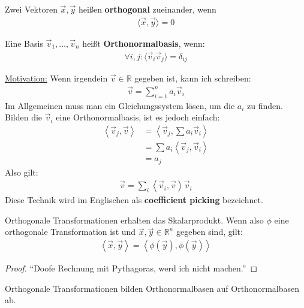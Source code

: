 \documentclass{report}
\newcommand*{\newpar}{\par\vspace{\baselineskip}\noindent}
\newcommand{\tbf}[1]{\textbf{#1}}
\newcommand{\ul}[1]{\underline{#1}}
\newcommand{\bR}{\mathbb{R}}
\newcommand{\vv}{\vec{v}}
\newcommand{\vx}{\vec{x}}
\newcommand{\vy}{\vec{y}}
\newcommand{\scalar}[2]{\left\langle #1, #2 \right\rangle}
\begin{document}
\begin{definition}
 Zwei Vektoren $\vx, \vy$ heißen \tbf{orthogonal} zueinander, wenn 
 \begin{align*}
  \langle \vx, \vy \rangle = 0
 \end{align*}
\end{definition}
\begin{definition}
 Eine Basis $\vv_1, \hdots, \vv_n$ heißt \tbf{Orthonormalbasis}, wenn:
 \begin{align*}
   \forall i,j : \langle \vv_i \vv_j \rangle = \delta_{ij}
 \end{align*}
\end{definition}
\newpar
\ul{Motivation:}
Wenn irgendein $\vv \in \bR$ gegeben ist, kann ich schreiben:
\begin{align*}
 \vv = \sum_{i = 1}^n a_i \vv_i
\end{align*}
Im Allgemeinen muss man ein Gleichungssystem lösen, um die $a_i$ zu finden. Bilden die $\vv_i$ eine Orthonormalbasis, ist es jedoch einfach:
\begin{align*}
  \scalar{\vv_j}{\vv} &= \scalar{\vv_j}{\sum a_i \vv_i}\\
                      &= \sum a_i \scalar{\vv_j}{\vv_i}\\
                      &= a_j
\end{align*}
Also gilt:
\begin{align*}
 \vv = \sum_i \scalar{\vv_i}{\vv} \vv_i
\end{align*}
Diese Technik wird im Englischen als \tbf{coefficient picking} bezeichnet.
\begin{theorem}
 Orthogonale Transformationen erhalten das Skalarprodukt. Wenn also $\phi$ eine orthogonale Transformation ist und $\vx, \vy \in \bR^n$ gegeben sind, gilt:
 \begin{align*}
  \scalar{\vx}{\vy} = \scalar{\phi(\vy)}{\phi(\vy)}
 \end{align*}
\end{theorem}
\begin{proof}
 ``Doofe Rechnung mit Pythagoras, werd ich nicht machen.''
\end{proof}
\begin{konsequenz}
 \label{orthotransbasis}
 Orthogonale Transformationen bilden Orthonormalbasen auf Orthonormalbasen ab.
\end{konsequenz}
\end{document}
